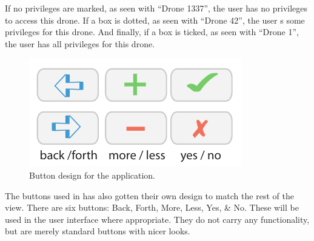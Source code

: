 If no privileges are marked, as seen with ``Drone 1337'', the user has no privileges to access this drone.
If a box is dotted, as seen with ``Drone 42'', the user s some privileges for this drone.
And finally, if a box is ticked, as seen with ``Drone 1'', the user has all privileges for this drone.

\begin{figure}[htb]
    \centering
    \includegraphics[scale=1.0]{gfx/button.pdf}
    \caption{Button design for the application.}
    \label{fig:button_design}
\end{figure}

The buttons used in \projectname{} has also gotten their own design to match the rest of the view.
There are six buttons: 
Back, Forth, More, Less, Yes, \& No. 
These will be used in the user interface where appropriate. 
They do not carry any functionality, but are merely standard buttons with nicer looks. 

